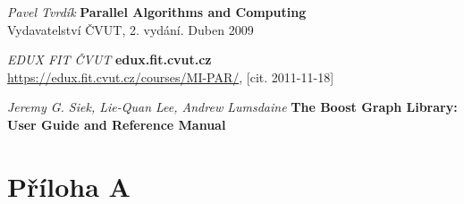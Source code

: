 \documentclass[]{article}
\begin{document}
\newpage
\begin{thebibliography}{9}

{\em Pavel Tvrdík}
       {\bf Parallel Algorithms and Computing}\\
		Vydavatelství ČVUT, 2. vydání. Duben 2009

{\em EDUX FIT ČVUT}
       {\bf edux.fit.cvut.cz}\\
       \url{https://edux.fit.cvut.cz/courses/MI-PAR/}, [cit. 2011-11-18]
       
{\em Jeremy G. Siek, Lie-Quan Lee, Andrew Lumsdaine }
       {\bf The Boost Graph Library: User Guide and Reference Manual}\\
       
       
 \end{thebibliography}

\section{Příloha A}

\end{document}
